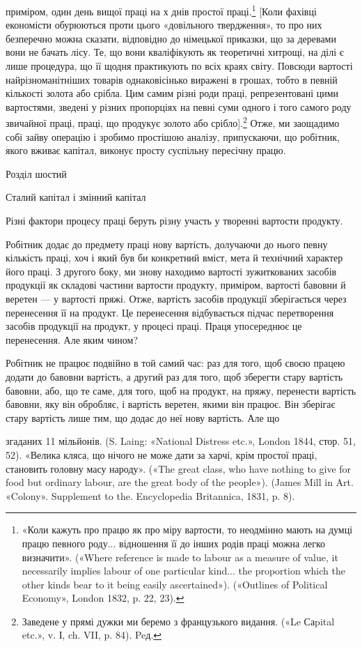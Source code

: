 приміром, один день вищої праці на х днів простої праці.\footnote{
«Коли кажуть про працю як про міру вартости, то неодмінно мають
на думці працю певного роду... відношення її до інших родів праці можна
легко визначити». («Where reference is made to labour as a measure of
value, it necessarily implies labour of one particular kind... the proportion
which the other kinds bear to it being easily ascertained»). («Outlines of
Political Economy», London 1832, p. 22, 23).
} [Коли
фахівці економісти обурюються проти цього «довільного твердження»,
то про них безперечно можна сказати, відповідно до
німецької приказки, що за деревами вони не бачать лісу. Те, що
вони кваліфікують як теоретичні хитрощі, на ділі є лише процедура,
що її щодня практикують по всіх краях світу. Повсюди
вартості найрізноманітніших товарів однаковісінько виражені
в грошах, тобто в певній кількості золота або срібла. Цим самим
різні роди праці, репрезентовані цими вартостями, зведені у
різних пропорціях на певні суми одного і того самого роду звичайної
праці, праці, що продукує золото або срібло].\footnote*{
Заведене у прямі дужки ми беремо з французького видання. («Le Саpital
etc.», v. І, ch. VII, p. 84). Peд.
} Отже,
ми заощадимо собі зайву операцію і зробимо простішою аналізу,
припускаючи, що робітник, якого вживає капітал, виконує
просту суспільну пересічну працю.

Розділ шостий

Сталий капітал і змінний капітал

Різні фактори процесу праці беруть різну участь у творенні
вартости продукту.

Робітник додає до предмету праці нову вартість, долучаючи
до нього певну кількість праці, хоч і який був би конкретний
вміст, мета й технічний характер його праці. З другого боку, ми
знову находимо вартості зужиткованих засобів продукції як
складові частини вартости продукту, приміром, вартості бавовни
й веретен — у вартості пряжі. Отже, вартість засобів продукції
зберігається через перенесення її на продукт. Це перенесення
відбувається підчас перетворення засобів продукції на продукт,
у процесі праці. Праця упосереднює це перенесення. Але яким
чином?

Робітник не працює подвійно в той самий час: раз для того,
щоб своєю працею додати до бавовни вартість, а другий раз для
того, щоб зберегти стару вартість бавовни, або, що те саме, для
того, щоб на продукт, на пряжу, перенести вартість бавовни, яку
він обробляє, і вартість веретен, якими він працює. Він зберігає
стару вартість лише тим, що додає до неї нову вартість. Але що

згаданих 11 мільйонів. (S. Laing: «National Distress etc.», London
1844, стор. 51, 52). «Велика кляса, що нічого не може дати за харчі,
крім простої праці, становить головну масу народу». («The great class,
who have nothing to give for food but ordinary labour, are the great body
of the people»). (James Mill in Art. «Colony». Supplement to the. Encyclopedia
Britannica, 1831, p. 8).